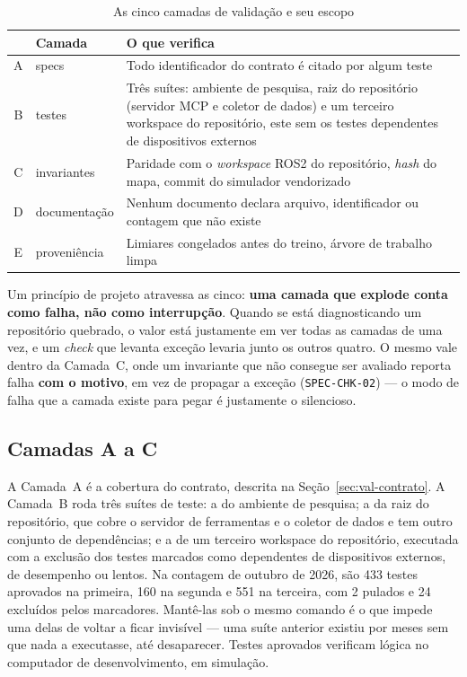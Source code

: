 \begin{table}[h]
    \centering
    \begin{tabularx}{\textwidth}{|c|l|X|}
        \hline
        \textbf{} & \textbf{Camada} & \textbf{O que verifica} \\
        \hline
        A & specs & Todo identificador do contrato é citado por algum teste \\
        \hline
        B & testes & Três suítes: ambiente de pesquisa, raiz do repositório
        (servidor MCP e coletor de dados) e um terceiro workspace do repositório, este sem os
        testes dependentes de dispositivos externos \\
        \hline
        C & invariantes & Paridade com o \textit{workspace} ROS2 do repositório,
        \textit{hash} do mapa, commit do simulador vendorizado \\
        \hline
        D & documentação & Nenhum documento declara arquivo, identificador ou
        contagem que não existe \\
        \hline
        E & proveniência & Limiares congelados antes do treino, árvore de
        trabalho limpa \\
        \hline
    \end{tabularx}
    \caption{As cinco camadas de validação e seu escopo}
    \label{tab:val_camadas}
\end{table}

Um princípio de projeto atravessa as cinco: \textbf{uma camada que explode conta
como falha, não como interrupção}. Quando se está diagnosticando um repositório
quebrado, o valor está justamente em ver todas as camadas de uma vez, e um
\textit{check} que levanta exceção levaria junto os outros quatro. O mesmo vale
dentro da Camada~C, onde um invariante que não consegue ser avaliado reporta
falha \textbf{com o motivo}, em vez de propagar a exceção
(\texttt{SPEC-CHK-02}) --- o modo de falha que a camada existe para pegar é
justamente o silencioso.

\subsection{Camadas A a C}

A Camada~A é a cobertura do contrato, descrita na Seção~\ref{sec:val-contrato}. A
Camada~B roda três suítes de teste: a do ambiente de pesquisa; a da raiz do
repositório, que cobre o servidor de ferramentas e o coletor de dados e tem
outro conjunto de dependências; e a de um terceiro workspace do repositório, executada com a exclusão dos
testes marcados como dependentes de dispositivos externos, de desempenho ou lentos. Na
contagem de outubro de 2026, são 433 testes aprovados na primeira, 160 na
segunda e 551 na terceira, com 2 pulados e 24 excluídos pelos marcadores.
Mantê-las sob o mesmo comando é o que impede uma delas de voltar a ficar
invisível --- uma suíte anterior existiu por meses sem que nada a executasse,
até desaparecer. Testes aprovados verificam lógica no computador de
desenvolvimento, em simulação.

